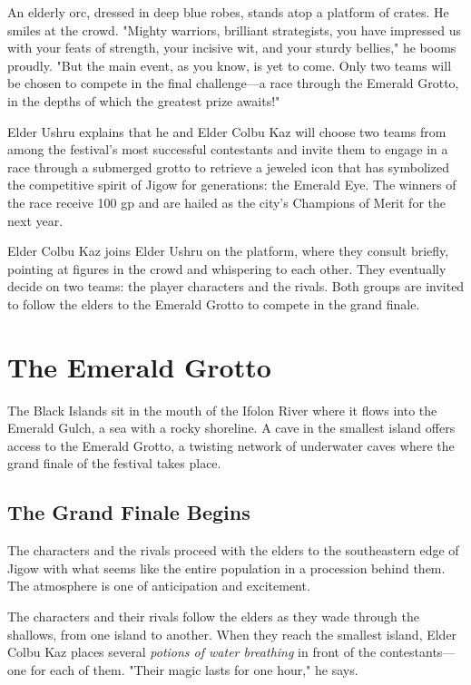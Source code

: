 \documentclass[letterpaper, 11pt, bg=full, twocolumn]{dndbook}
\begin{document}
\begin{DndReadAloud}
An elderly orc, dressed in deep blue robes, stands atop a platform of crates. He smiles at the crowd. "Mighty warriors, brilliant strategists, you have impressed us with your feats of strength, your incisive wit, and your sturdy bellies," he booms proudly. "But the main event, as you know, is yet to come. Only two teams will be chosen to compete in the final challenge---a race through the Emerald Grotto, in the depths of which the greatest prize awaits!"
\end{DndReadAloud}

Elder Ushru explains that he and Elder Colbu Kaz will choose two teams from among the festival's most successful contestants and invite them to engage in a race through a submerged grotto to retrieve a jeweled icon that has symbolized the competitive spirit of Jigow for generations: the Emerald Eye. The winners of the race receive 100 gp and are hailed as the city's Champions of Merit for the next year.

Elder Colbu Kaz joins Elder Ushru on the platform, where they consult briefly, pointing at figures in the crowd and whispering to each other. They eventually decide on two teams: the player characters and the rivals. Both groups are invited to follow the elders to the Emerald Grotto to compete in the grand finale.
\section{The Emerald Grotto}

The Black Islands sit in the mouth of the Ifolon River where it flows into the Emerald Gulch, a sea with a rocky shoreline. A cave in the smallest island offers access to the Emerald Grotto, a twisting network of underwater caves where the grand finale of the festival takes place.

\subsection{The Grand Finale Begins}

The characters and the rivals proceed with the elders to the southeastern edge of Jigow with what seems like the entire population in a procession behind them. The atmosphere is one of anticipation and excitement.

The characters and their rivals follow the elders as they wade through the shallows, from one island to another. When they reach the smallest island, Elder Colbu Kaz places several \textit{potions of water breathing} in front of the contestants---one for each of them. "Their magic lasts for one hour," he says.
\end{document}
